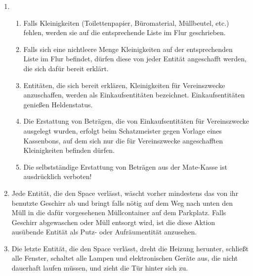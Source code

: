 \documentclass[12pt,a4paper]{scrartcl}
\begin{document}
\begin{enumerate}
  \item\begin{enumerate}
    \item Falls Kleinigkeiten (Toilettenpapier, Büromaterial, Müllbeutel, etc.)
      fehlen, werden sie auf die entsprechende Liste im Flur geschrieben.
    \item Falls sich eine nichtleere Menge Kleinigkeiten auf der entsprechenden
      Liste im Flur befindet, dürfen diese von jeder Entität angeschafft werden,
      die sich dafür bereit erklärt.
    \item Entitäten, die sich bereit erklären, Kleinigkeiten für Vereinszwecke
      anzuschaffen, werden als Einkaufsentitäten bezeichnet. Einkaufsentitäten
      genießen Heldenstatus.
    \item Die Erstattung von Beträgen, die von Einkaufsentitäten für
      Vereinszwecke ausgelegt wurden, erfolgt beim Schatzmeister gegen Vorlage
      eines Kassenbons, auf dem sich nur die für Vereinszwecke angeschafften
      Kleinigkeiten befinden dürfen.
    \item Die selbstständige Erstattung von Beträgen aus der Mate-Kasse ist
      ausdrücklich verboten!
  \end{enumerate}

  \item Jede Entität, die den Space verlässt, wäscht vorher mindestens das von
    ihr benutzte Geschirr ab und bringt falls nötig auf dem Weg nach unten den
    Müll in die dafür vorgesehenen Müllcontainer auf dem Parkplatz. Falls
    Geschirr abgewaschen oder Müll entsorgt wird, ist die diese Aktion ausübende
    Entität als Putz- oder Aufräumentität anzusehen.

  \item Die letzte Entität, die den Space verlässt, dreht die Heizung herunter,
    schließt alle Fenster, schaltet alle Lampen und elektronischen Geräte aus,
    die nicht dauerhaft laufen müssen, und zieht die Tür hinter sich zu.
\end{enumerate}
\end{document}

